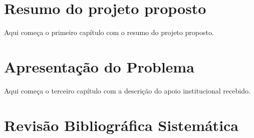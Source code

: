 \documentclass[12pt]{report}
\begin{document}
%
%
\geraTitulo
%
\folhaDeRosto
%
%
%
\tableofcontents
\thispagestyle{empty}
\clearpage
%

\sectionfont{\scshape}

\chapter{Resumo do projeto proposto}\label{chp:resumo_proj} 

Aqui começa o primeiro capítulo com o resumo do projeto proposto.

\chapter{Apresentação do Problema}\label{chp:apresentacao}

Aqui começa o terceiro capítulo com a descrição do apoio institucional recebido.

\chapter{Revisão Bibliográfica Sistemática}\label{chp:revisao}


\end{document}
